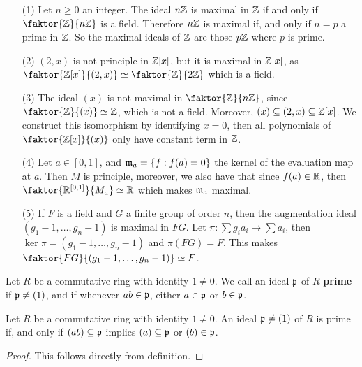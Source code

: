 \begin{example}\label{example_5.15}
  \begin{enumerate}
    \item[(1)] Let $n \geq 0$ an integer. The ideal  $n\mathbb{Z}$ is maximal in
      $\mathbb{Z}$ if and only if  $\faktor{\Z}{n\Z}$ is a field. Therefore $n\mathbb{Z}$
      is maximal if, and only if  $n=p$ a prime in $\mathbb{Z}$. So the maximal
      ideals of $\mathbb{Z}$ are those  $p\mathbb{Z}$ where  $p$ is prime.

    \item[(2)] $(2,x)$ is not principle in $\mathbb{Z}[x]$, but it is maximal in
      $\mathbb{Z}[x]$, as $\faktor{\Z[x]}{(2,x)} \simeq \faktor{\Z}{2\Z}$ which
      is a field.

    \item[(3)] The ideal $(x)$ is not maximal in $\faktor{\Z}{n\Z}$, since
      $\faktor{\Z}{(x)} \simeq \Z$, which is not a field. Moreover, $(x)
      \subseteq (2,x) \subseteq \mathbb{Z}[x]$. We construct this isomorphism by
      identifying $x=0$, then all polynomials of $\faktor{\Z[x]}{(x)}$ only
      have constant term in $\mathbb{Z}$.

    \item[(4)] Let $a \in [0,1]$, and $\mathfrak{m}_a=\{f : f(a)=0\}$ the kernel of the
      evaluation map at $a$. Then  $M$ is principle, moreover, we also
      have that since  $f(a) \in \mathbb{R}$, then $\faktor{\R^{[0,1]}}{M_a}
      \simeq \R$ which makes $\mathfrak{m}_a$ maximal.

    \item[(5)] If $F$ is a field and  $G$ a finite group of order $n$, then
      the augmentation ideal  $(g_1-1, \dots, g_n-1)$ is maximal in $FG$.
      Let $\pi:\sum{g_ia_i} \xrightarrow{} \sum{a_i}$, then
      $\ker{\pi}=(g_1-1, \dots, g_n-1)$ and $\pi(FG)=F$. This makes
      $\faktor{FG}{(g_1-1, \dots, g_n-1)} \simeq F$.
  \end{enumerate}
\end{example}

\begin{definition}
  Let $R$ be a commutative ring with identity  $1 \neq 0$. We call an
  ideal $\mathfrak{p}$ of $R$ \textbf{prime} if $\mathfrak{p} \neq (1)$, and if whenever
  $ab \in \mathfrak{p}$, either $a \in \mathfrak{p}$ or $b \in \mathfrak{p}$.
\end{definition}

\begin{proposition}\label{proposition_5.4.5}
  Let $R$ be a commutative ring with identity $1 \neq 0$. An ideal
  $\mathfrak{p} \neq (1)$ of $R$ is prime if, and only if $(ab) \subseteq \mathfrak{p}$
  implies $(a) \subseteq \mathfrak{p}$ or $(b) \in \mathfrak{p}$.
\end{proposition}
\begin{proof}
  This follows directly from definition.
\end{proof}

